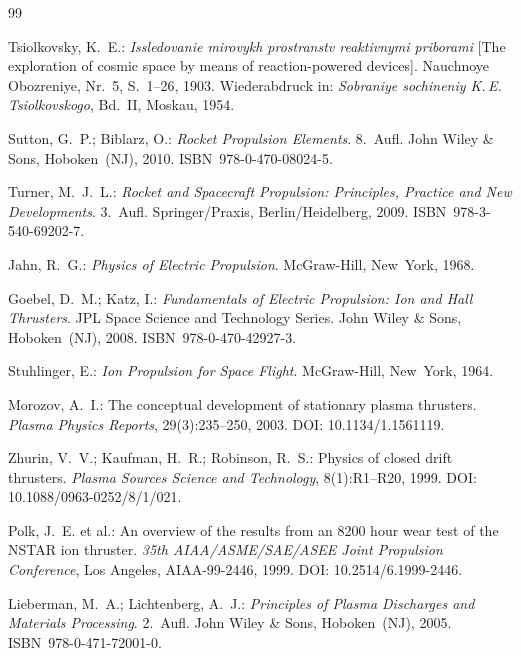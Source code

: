 ﻿\documentclass[a4paper,12pt,twoside]{article}
\theoremstyle{plain}
\theoremstyle{definition}
\theoremstyle{remark}
\begin{document}
	\begin{thebibliography}{99}

	Tsiolkovsky, K.~E.:
	\textit{Issledovanie mirovykh prostranstv reaktivnymi priborami}
	[The exploration of cosmic space by means of reaction-powered devices].
	Nauchnoye Obozreniye, Nr.~5, S.~1--26, 1903.
	Wiederabdruck in: \textit{Sobraniye sochineniy K.\,E.\,Tsiolkovskogo},
	Bd.~II, Moskau, 1954.

	Sutton, G.~P.; Biblarz, O.:
	\textit{Rocket Propulsion Elements}.
	8.~Aufl. John Wiley \& Sons, Hoboken~(NJ), 2010.
	ISBN~978-0-470-08024-5.

	Turner, M.~J.~L.:
	\textit{Rocket and Spacecraft Propulsion: Principles, Practice and
	New Developments}.
	3.~Aufl. Springer/Praxis, Berlin/Heidelberg, 2009.
	ISBN~978-3-540-69202-7.

	Jahn, R.~G.:
	\textit{Physics of Electric Propulsion}.
	McGraw-Hill, New~York, 1968.

	Goebel, D.~M.; Katz, I.:
	\textit{Fundamentals of Electric Propulsion: Ion and Hall Thrusters}.
	JPL Space Science and Technology Series.
	John Wiley \& Sons, Hoboken~(NJ), 2008.
	ISBN~978-0-470-42927-3.

	Stuhlinger, E.:
	\textit{Ion Propulsion for Space Flight}.
	McGraw-Hill, New~York, 1964.

	Morozov, A.~I.:
	The conceptual development of stationary plasma thrusters.
	\textit{Plasma Physics Reports}, 29(3):235--250, 2003.
	DOI: 10.1134/1.1561119.

	Zhurin, V.~V.; Kaufman, H.~R.; Robinson, R.~S.:
	Physics of closed drift thrusters.
	\textit{Plasma Sources Science and Technology}, 8(1):R1--R20, 1999.
	DOI: 10.1088/0963-0252/8/1/021.

	Polk, J.~E. et al.:
	An overview of the results from an 8200 hour wear test of the NSTAR ion
	thruster.
	\textit{35th AIAA/ASME/SAE/ASEE Joint Propulsion Conference}, Los Angeles,
	AIAA-99-2446, 1999.
	DOI: 10.2514/6.1999-2446.

	Lieberman, M.~A.; Lichtenberg, A.~J.:
	\textit{Principles of Plasma Discharges and Materials Processing}.
	2.~Aufl. John Wiley \& Sons, Hoboken~(NJ), 2005.
	ISBN~978-0-471-72001-0.


\end{thebibliography}
\end{document}
